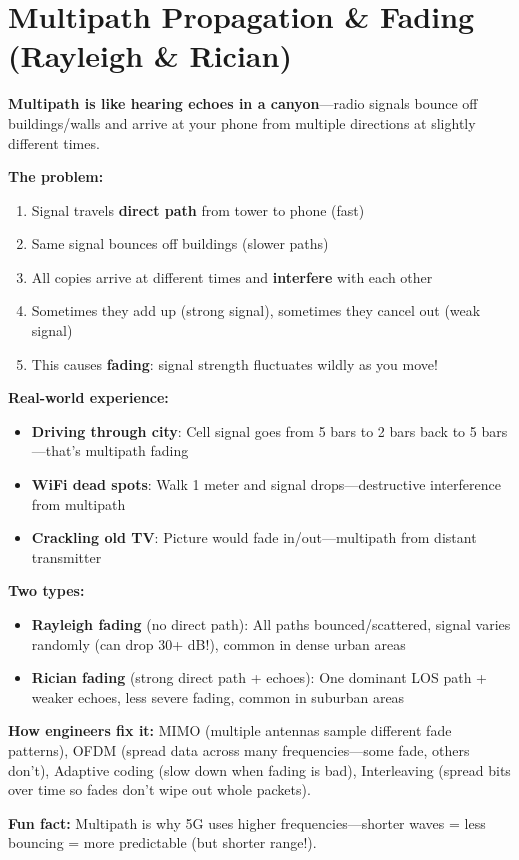 \chapter{Multipath Propagation \& Fading (Rayleigh \& Rician)}
\label{ch:multipath}

\begin{nontechnical}
\textbf{Multipath is like hearing echoes in a canyon}---radio signals bounce off buildings/walls and arrive at your phone from multiple directions at slightly different times.

\textbf{The problem:}
\begin{enumerate}
\item Signal travels \textbf{direct path} from tower to phone (fast)
\item Same signal bounces off buildings (slower paths)
\item All copies arrive at different times and \textbf{interfere} with each other
\item Sometimes they add up (strong signal), sometimes they cancel out (weak signal)
\item This causes \textbf{fading}: signal strength fluctuates wildly as you move!
\end{enumerate}

\textbf{Real-world experience:}
\begin{itemize}
\item \textbf{Driving through city}: Cell signal goes from 5 bars to 2 bars back to 5 bars---that's multipath fading
\item \textbf{WiFi dead spots}: Walk 1 meter and signal drops---destructive interference from multipath
\item \textbf{Crackling old TV}: Picture would fade in/out---multipath from distant transmitter
\end{itemize}

\textbf{Two types:}
\begin{itemize}
\item \textbf{Rayleigh fading} (no direct path): All paths bounced/scattered, signal varies randomly (can drop 30+ dB!), common in dense urban areas
\item \textbf{Rician fading} (strong direct path + echoes): One dominant LOS path + weaker echoes, less severe fading, common in suburban areas
\end{itemize}

\textbf{How engineers fix it:} MIMO (multiple antennas sample different fade patterns), OFDM (spread data across many frequencies---some fade, others don't), Adaptive coding (slow down when fading is bad), Interleaving (spread bits over time so fades don't wipe out whole packets).

\textbf{Fun fact:} Multipath is why 5G uses higher frequencies---shorter waves = less bouncing = more predictable (but shorter range!).
\end{nontechnical}

